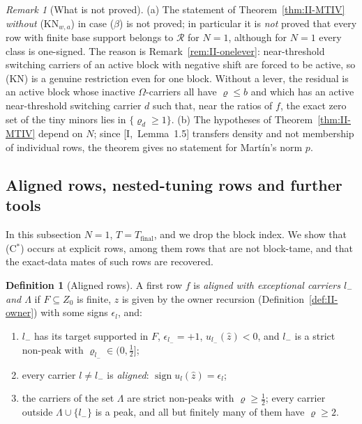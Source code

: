 \documentclass[10pt]{amsart}
\theoremstyle{definition}
\newtheorem{definition}[theorem]{Definition}
\theoremstyle{remark}
\newtheorem{remark}[theorem]{Remark}
\newcommand{\sgn}{\operatorname{sign}}
\newcommand{\Rec}{\mathcal R}
\newcommand{\zh}{\hat z}
\begin{document}
\begin{remark}[What is not proved]\label{rem:II-notMTIV}
(a) The statement of Theorem~\ref{thm:II-MTIV} \emph{without} (KN$_{w,a}$) in case ($\beta$)
is not proved; in particular it is \emph{not} proved that every row with finite base
support belongs to $\Rec$ for $N=1$, although for $N=1$ every class is one-signed.
The reason is Remark~\ref{rem:II-onelever}: near-threshold switching carriers of an
active block with negative shift are forced to be active, so (KN) is a genuine
restriction even for one block.  Without a lever, the residual is an active block
whose inactive $\Omega$-carriers all have $\varrho\le b$ and which has an active
near-threshold switching carrier $d$ such that, near the ratios of $f$, the exact zero
set of the tiny minors lies in $\{\varrho_d\ge1\}$.
(b) The hypotheses of Theorem~\ref{thm:II-MTIV} depend on $N$; since
[I,~Lemma~1.5] transfers density and not membership of individual rows, the theorem
gives no statement for Mart\'in's norm $p$.
\end{remark}

\subsection{Aligned rows, nested-tuning rows and further tools}\label{subsec:II-nested}

In this subsection $N=1$, $T=T_{\mathrm{final}}$, and we drop the block index.  We
show that (C$^*$) occurs at explicit rows, among them rows that are not
block-tame, and that the exact-data mates of such rows are recovered.

\begin{definition}[Aligned rows]\label{def:II-aligned}
A first row $f$ is \emph{aligned with exceptional carriers $l_-$ and $\Lambda$} if
$F\subseteq Z_0$ is finite, $z$ is given by the owner recursion
(Definition~\ref{def:II-owner}) with some signs $\epsilon_l$, and:
\begin{enumerate}
\item[(A1)] $l_-$ has its target supported in $F$, $\epsilon_{l_-}=+1$, $u_{l_-}(\zh)<0$,
and $l_-$ is a strict non-peak with $\varrho_{l_-}\in(0,\frac12]$;
\item[(A2)] every carrier $l\ne l_-$ is \emph{aligned}: $\sgn u_l(\zh)=\epsilon_l$;
\item[(A3)] the carriers of the set $\Lambda$ are strict non-peaks with $\varrho\ge\frac12$;
every carrier outside $\Lambda\cup\{l_-\}$ is a peak, and all but finitely many of them
have $\varrho\ge2$.
\end{enumerate}
\end{definition}
\end{document}
